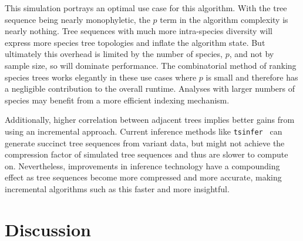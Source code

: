 \documentclass{article}
\newcommand{\tsinfer}{{\texttt{tsinfer}}}
\begin{document}
This simulation portrays an optimal use case for this algorithm. With the tree
sequence being nearly monophyletic, the $p$ term in the algorithm complexity is
nearly nothing. Tree sequences with much more intra-species diversity will express
more species tree topologies and inflate the algorithm state. But ultimately this
overhead is limited by the number of species, $p$, and not by sample size, so will
dominate performance. The combinatorial method of ranking
species trees works elegantly in these use cases where $p$ is small and therefore has
a negligible contribution to the overall runtime. Analyses with larger numbers of
species may benefit from a more efficient indexing mechanism.

Additionally, higher correlation between adjacent trees implies
better gains from using an incremental approach. Current inference methods
like \tsinfer{}~\citep{tsinfer} can generate succinct tree sequences from variant data,
but might not achieve the compression factor of simulated tree sequences and thus
are slower to compute on. Nevertheless, improvements in inference technology have
a compounding effect as tree sequences become more compressed and more accurate,
making incremental algorithms such as this faster and more insightful.

\section{Discussion}




\end{document}
